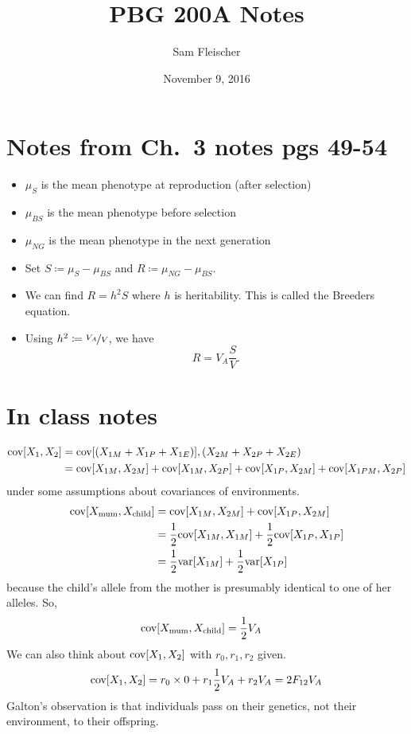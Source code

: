 \documentclass{article}
\title{PBG 200A Notes}
\author{Sam Fleischer}
\date{November 9, 2016}
\newcommand{\vari}[1]{\text{var}\qty[#1]}
\newcommand{\cov}[1]{\text{cov}\qty[#1]}
\begin{document}
    \maketitle

    \section{Notes from Ch.~3 notes pgs 49-54}
        \begin{itemize}
            \item $\mu_S$ is the mean phenotype at reproduction (after selection)
            \item $\mu_{BS}$ is the mean phenotype before selection
            \item $\mu_{NG}$ is the mean phenotype in the next generation
            \item Set $S \coloneqq \mu_S - \mu_{BS}$ and $R \coloneqq \mu_{NG} - \mu_{BS}$.
            \item We can find $R = h^2S$ where $h$ is heritability.  This is called the Breeders equation.
            \item Using $h^2 \coloneqq \nicefrac{V_A}{V}$, we have $$R = V_A\frac{S}{V}.$$
        \end{itemize}

    \section{In class notes}
        \begin{align}
            \cov{X_1,X_2} &= \cov{(X_{1M} + X_{1P} + X_{1E})},(X_{2M} + X_{2P} + X_{2E}) \\
            &= \cov{X_{1M},X_{2M}} + \cov{X_{1M},X_{2P}} + \cov{X_{1P},X_{2M}} + \cov{X_{1PM},X_{2P}}
        \end{align}
        under some assumptions about covariances of environments.
        \begin{align}
            \cov{X_\text{mum},X_\text{child}} &= \cov{X_{1M},X_{2M}} + \cov{X_{1P},X_{2M}} \\
            &= \frac{1}{2}\cov{X_{1M},X_{1M}} + \frac{1}{2}\cov{X_{1P},X_{1P}} \\
            &= \frac{1}{2}\vari{X_{1M}} + \frac{1}{2}\vari{X_{1P}}
        \end{align}
        because the child's allele from the mother is presumably identical to one of her alleles.  So,
        \begin{align}
            \cov{X_\text{mum},X_\text{child}} &= \frac{1}{2}V_A
        \end{align}
        We can also think about $\cov{X_1,X_2}$ with $r_0,r_1,r_2$ given.
        \begin{align}
            \cov{X_1,X_2} = r_0\times0 + r_1\frac{1}{2}V_A + r_2 V_A = 2F_{12}V_A
        \end{align}
        Galton's observation is that individuals pass on their genetics, not their environment, to their offspring.
\end{document}
